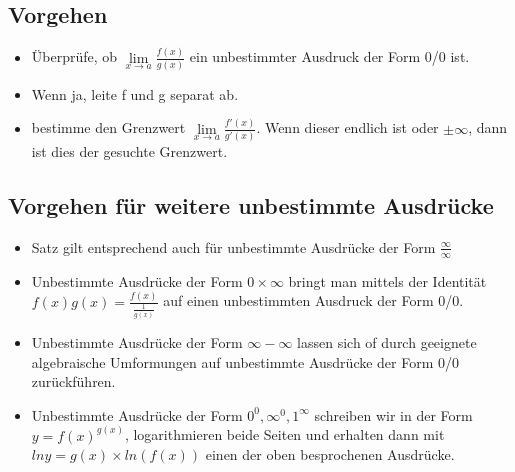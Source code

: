 \documentclass[../main.tex]{subfiles}
\begin{document}
\subsection{Vorgehen}
\begin{itemize}
    \item Überprüfe, ob $\lim\limits_{x \to a}\frac{f(x)}{g(x)}$ ein unbestimmter Ausdruck der Form 0/0 ist.
    \item Wenn ja, leite f und g separat ab.
    \item bestimme den Grenzwert $\lim\limits_{x \to a}\frac{f'(x)}{g'(x)}$. Wenn dieser endlich ist oder $\pm \infty$, dann ist dies der gesuchte Grenzwert.
\end{itemize}

\subsection{Vorgehen für weitere unbestimmte Ausdrücke}
\begin{itemize}
    \item Satz gilt entsprechend auch für unbestimmte Ausdrücke der Form $\frac{\infty}{\infty}$ 
    \item Unbestimmte Ausdrücke der Form $0 \times \infty$ bringt man mittels der Identität \\
    $f(x)g(x)=\frac{f(x)}{\frac{1}{g(x)}}$ auf einen unbestimmten Ausdruck der Form 0/0.
    \item Unbestimmte Ausdrücke der Form $\infty - \infty$ lassen sich of durch geeignete algebraische 
    Umformungen auf unbestimmte Ausdrücke der Form 0/0 zurückführen.
    \item Unbestimmte Ausdrücke der Form $0^0, \infty^0, 1^\infty$ schreiben wir in der Form $y=f(x)^{g(x)}$,
    logarithmieren beide Seiten und erhalten dann mit $ln y=g(x) \times ln(f(x))$ einen der oben besprochenen Ausdrücke.
\end{itemize}
\end{document}
